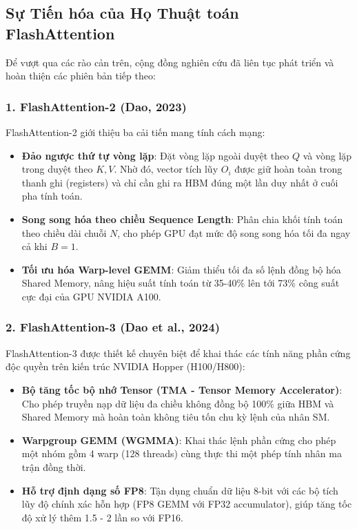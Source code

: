 \documentclass[10pt,a4paper]{article}
\begin{document}
\subsection{Sự Tiến hóa của Họ Thuật toán FlashAttention}
Để vượt qua các rào cản trên, cộng đồng nghiên cứu đã liên tục phát triển và hoàn thiện các phiên bản tiếp theo:

\subsubsection{1. FlashAttention-2 (Dao, 2023)}
FlashAttention-2 giới thiệu ba cải tiến mang tính cách mạng:
\begin{itemize}
    \item \textbf{Đảo ngược thứ tự vòng lặp}: Đặt vòng lặp ngoài duyệt theo $Q$ và vòng lặp trong duyệt theo $K, V$. Nhờ đó, vector tích lũy $O_i$ được giữ hoàn toàn trong thanh ghi (registers) và chỉ cần ghi ra HBM đúng một lần duy nhất ở cuối pha tính toán.
    \item \textbf{Song song hóa theo chiều Sequence Length}: Phân chia khối tính toán theo chiều dài chuỗi $N$, cho phép GPU đạt mức độ song song hóa tối đa ngay cả khi $B=1$.
    \item \textbf{Tối ưu hóa Warp-level GEMM}: Giảm thiểu tối đa số lệnh đồng bộ hóa Shared Memory, nâng hiệu suất tính toán từ 35-40\% lên tới 73\% công suất cực đại của GPU NVIDIA A100.
\end{itemize}

\subsubsection{2. FlashAttention-3 (Dao et al., 2024)}
FlashAttention-3 được thiết kế chuyên biệt để khai thác các tính năng phần cứng độc quyền trên kiến trúc NVIDIA Hopper (H100/H800):
\begin{itemize}
    \item \textbf{Bộ tăng tốc bộ nhớ Tensor (TMA - Tensor Memory Accelerator)}: Cho phép truyền nạp dữ liệu đa chiều không đồng bộ 100\% giữa HBM và Shared Memory mà hoàn toàn không tiêu tốn chu kỳ lệnh của nhân SM.
    \item \textbf{Warpgroup GEMM (WGMMA)}: Khai thác lệnh phần cứng cho phép một nhóm gồm 4 warp (128 threads) cùng thực thi một phép tính nhân ma trận đồng thời.
    \item \textbf{Hỗ trợ định dạng số FP8}: Tận dụng chuẩn dữ liệu 8-bit với các bộ tích lũy độ chính xác hỗn hợp (FP8 GEMM với FP32 accumulator), giúp tăng tốc độ xử lý thêm 1.5 - 2 lần so với FP16.
\end{itemize}
\end{document}
